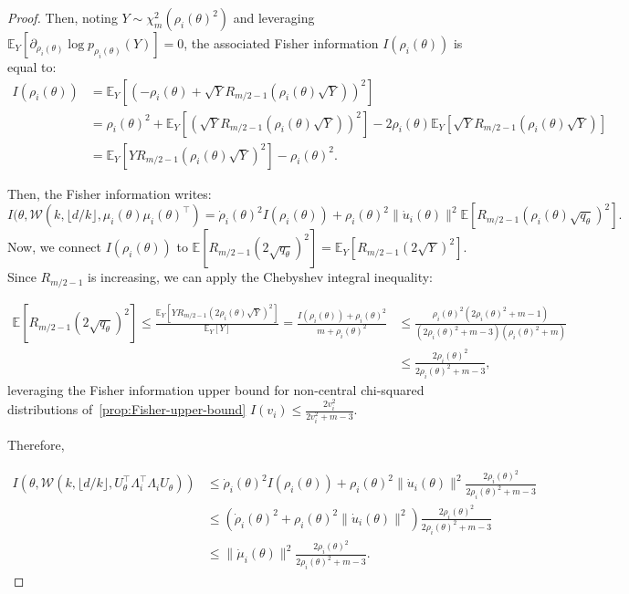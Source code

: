 \documentclass{article}
\theoremstyle{plain}
\theoremstyle{definition}
\theoremstyle{remark}
\begin{document}
\begin{proof}
Then, noting $Y \sim \chi_m^2(\rho_i(\theta)^2)$ and leveraging $\mathbb{E}_Y[\partial_{\rho_i(\theta)} \log p_{\rho_i(\theta)}(Y)] = 0$, the associated Fisher information $I(\rho_i(\theta))$ is equal to:
\begin{align*}
    I(\rho_i(\theta)) &= \mathbb{E}_Y\left[\left(- \rho_i(\theta) + \sqrt{Y} R_{m/2-1}\left(\rho_i(\theta) \sqrt{Y}\right)\right)^2\right]\\ &= \rho_i(\theta)^2 + \mathbb{E}_Y\left[\left(\sqrt{Y} R_{m/2-1}\left(\rho_i(\theta) \sqrt{Y}\right)\right)^2\right]- 2 \rho_i(\theta) \mathbb{E}_Y\left[\sqrt{Y} R_{m/2-1}\left(\rho_i(\theta) \sqrt{Y}\right)\right]\\
    &= \mathbb{E}_Y\left[Y R_{m/2-1}\left(\rho_i(\theta) \sqrt{Y}\right)^2\right] - \rho_i(\theta)^2.
\end{align*}

Then, the Fisher information writes:
\[I(\theta, \mathcal{W}(k,\lfloor d/k \rfloor,\mu_i(\theta) \mu_i(\theta)^\top) = \dot \rho_i(\theta)^2 I(\rho_i(\theta)) + \rho_i(\theta)^2 \|\dot u_i(\theta)\|^2 \mathbb{E}\left[R_{m/2-1}\left(\rho_i(\theta)\sqrt{q_\theta}\right)^2 \right].\]
Now, we connect $I(\rho_i(\theta))$ to $\mathbb{E}\left[R_{m/2-1}(2\sqrt{q_\theta})^2 \right] = \mathbb{E}_Y\left[R_{m/2-1}\left(2\sqrt{Y}\right)^2 \right]$. Since $R_{m/2-1}$ is increasing, we can apply the Chebyshev integral inequality:

\begin{align*}
    \mathbb{E}\left[R_{m/2-1}\left(2\sqrt{q_\theta}\right)^2 \right] \leq \frac{\mathbb{E}_Y\left[YR_{m/2-1}\left(2 \rho_i(\theta) \sqrt{Y}\right)^2 \right]}{\mathbb{E}_Y\left[Y \right]} = \frac{I(\rho_i(\theta)) + \rho_i(\theta)^2}{m + \rho_i(\theta)^2} &\leq \frac{\rho_i(\theta)^2 (2\rho_i(\theta)^2 + m - 1) }{(2\rho_i(\theta)^2 + m - 3)(\rho_i(\theta)^2 + m)}\\
    &\leq \frac{2\rho_i(\theta)^2 }{2\rho_i(\theta)^2 + m - 3},
\end{align*}
leveraging the Fisher information upper bound for non-central chi-squared distributions of~\ref{prop:Fisher-upper-bound} $I(v_i) \leq \frac{2 v_i^2}{2 v_i^2 + m - 3}$.

Therefore,

\begin{align*}
    I(\theta, \mathcal{W}(k,\lfloor d/k \rfloor,U_\theta^\top \Lambda^{\top}_i \Lambda_i U_\theta)) &\leq  \dot \rho_i(\theta)^2 I(\rho_i(\theta)) + \rho_i(\theta)^2 \|\dot u_i(\theta)\|^2  \frac{2\rho_i(\theta)^2 }{2\rho_i(\theta)^2 + m - 3}\\
    &\leq (\dot \rho_i(\theta)^2 + \rho_i(\theta)^2 \|\dot u_i(\theta)\|^2 ) \frac{2\rho_i(\theta)^2 }{2\rho_i(\theta)^2 + m - 3}\\
    &\leq \|\dot \mu_i(\theta)\|^2 \frac{2\rho_i(\theta)^2 }{2\rho_i(\theta)^2 + m - 3}.
\end{align*}



\end{proof}
\end{document}
